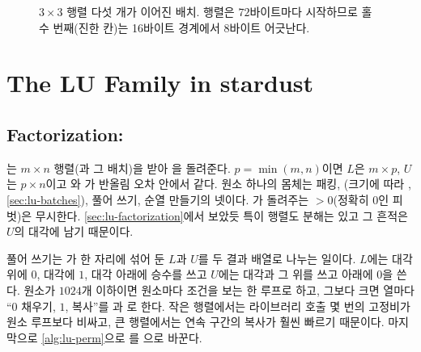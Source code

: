 \begin{figure}[t]
\centering
{}
\caption{$3\times3$  행렬 다섯 개가 이어진 배치. 행렬은 $72$바이트마다 시작하므로 홀수 번째(진한 칸)는 16바이트 경계에서 8바이트 어긋난다.}
\label{fig:lu-align}
\end{figure}

\section{The LU Family in stardust}
\label{sec:lu-stardust-family}

\subsection{Factorization: \texorpdfstring{}{lu}}

는 $m\times n$ 행렬(과 그 배치)을 받아 을 돌려준다. $p=\min(m,n)$이면 $L$은 $m\times p$, $U$는 $p\times n$이고 와 가 반올림 오차 안에서 같다. 원소 하나의 몸체는 패킹, (크기에 따라 , \cref{sec:lu-batches}), 풀어 쓰기, 순열 만들기의 넷이다. 가 돌려주는 $>0$(정확히 $0$인 피벗)은 무시한다. \cref{sec:lu-factorization}에서 보았듯 특이 행렬도 분해는 있고 그 흔적은 $U$의 대각에 남기 때문이다.

풀어 쓰기는 가 한 자리에 섞어 둔 $L$과 $U$를 두 결과 배열로 나누는 일이다. $L$에는 대각 위에 $0$, 대각에 $1$, 대각 아래에 승수를 쓰고 $U$에는 대각과 그 위를 쓰고 아래에 $0$을 쓴다. 원소가 $1024$개 이하이면 원소마다 조건을 보는 한 루프로 하고, 그보다 크면 열마다 ``$0$ 채우기, $1$, 복사''를 과 로 한다. 작은 행렬에서는 라이브러리 호출 몇 번의 고정비가 원소 루프보다 비싸고, 큰 행렬에서는 연속 구간의 복사가 훨씬 빠르기 때문이다. 마지막으로 \cref{alg:lu-perm}으로 를 으로 바꾼다.

